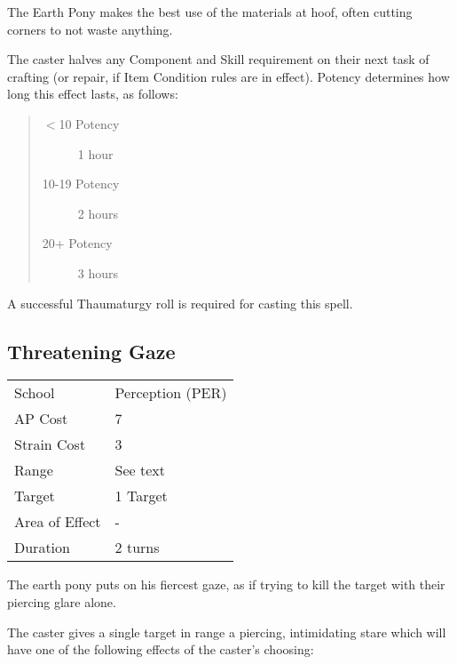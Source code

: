 \documentclass[11pt,a4paper,twocolumn]{book}
\begin{document}
\medskip

The Earth Pony makes the best use of the materials at hoof, often cutting corners to not waste anything.

The caster halves any Component and Skill requirement on their next task of crafting (or repair, if Item Condition rules are in effect). Potency determines how long this effect lasts, as follows:

\begin{quote}
	\begin{description}
		\item[$<$10 Potency] 	1 hour
		\item[10-19 Potency] 	2 hours
		\item[20+ Potency] 	    3 hours
	\end{description}	
\end{quote}

A successful Thaumaturgy roll is required for casting this spell.



\subsection*{Threatening Gaze}
{
	\begin{tabu} to 75mm{| X[l,4] | X[l,7] |}
		\hline
		School 			& Perception (PER) 	\\
		AP Cost	      	& 7 				\\
		Strain Cost     & 3 				\\
		Range     		& See text 	\\
		Target      	& 1 Target				\\
		Area of Effect  & - 	 		\\
		Duration     	& 2 turns 				\\ \hline
	\end{tabu}
	
}

\medskip

The earth pony puts on his fiercest gaze, as if trying to kill the target with their piercing glare alone.

The caster gives a single target in range a piercing, intimidating stare which will have one of the following effects of the caster's choosing:

\smallskip{}
\end{document}
